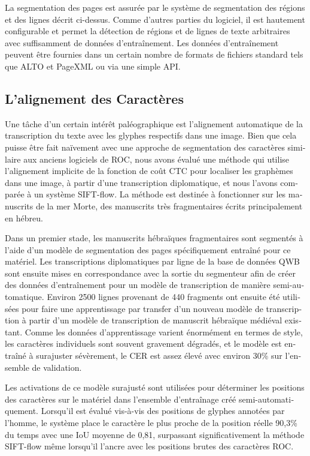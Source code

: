 \begin{french}
La segmentation des pages est assurée par le système de segmentation des
régions et des lignes décrit ci-dessus. Comme d'autres parties du logiciel, il
est hautement configurable et permet la détection de régions et de lignes de
texte arbitraires avec suffisamment de données d'entraînement. Les données
d'entraînement peuvent être fournies dans un certain nombre de formats de
fichiers standard tels que ALTO et PageXML ou via une simple API.

\subsection{L'alignement des Caractères}

Une tâche d'un certain intérêt paléographique est l'alignement automatique de
la transcription du texte avec les glyphes respectifs dans une image. Bien que
cela puisse être fait naïvement avec une approche de segmentation des
caractères similaire aux anciens logiciels de ROC, nous avons évalué une
méthode qui utilise l'alignement implicite de la fonction de coût CTC pour
localiser les graphèmes dans une image, à partir d'une transcription
diplomatique, et nous l'avons comparée à un système SIFT-flow. La méthode est
destinée à fonctionner sur les manuscrits de la mer Morte, des manuscrits très
fragmentaires écrits principalement en hébreu.

Dans un premier stade, les manuscrits hébraïques fragmentaires sont segmentés à
l'aide d'un modèle de segmentation des pages spécifiquement entraîné pour ce
matériel. Les transcriptions diplomatiques par ligne de la base de données QWB
sont ensuite mises en correspondance avec la sortie du segmenteur afin de créer
des données d'entraînement pour un modèle de transcription de manière
semi-automatique.  Environ 2500 lignes provenant de 440 fragments ont ensuite
été utilisées pour faire une apprentissage par transfer d'un nouveau modèle de
transcription à partir d'un modèle de transcription de manuscrit hébraïque
médiéval existant.  Comme les données d'apprentissage varient énormément en
termes de style, les caractères individuels sont souvent gravement dégradés, et
le modèle est entraîné à surajuster sévèrement, le CER est assez élevé avec
environ 30\% sur l'ensemble de validation.

Les activations de ce modèle surajusté sont utilisées pour déterminer les
positions des caractères sur le matériel dans l'ensemble d'entraînage créé
semi-automatiquement. Lorsqu'il est évalué vis-à-vis des positions de glyphes
annotées par l'homme, le système place le caractère le plus proche de la
position réelle 90,3\% du temps avec une IoU moyenne de 0,81, surpassant
significativement la méthode SIFT-flow même lorsqu'il l'ancre avec les
positions brutes des caractères ROC.


\end{french}
